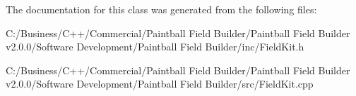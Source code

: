 The documentation for this class was generated from the following files:\begin{DoxyCompactItemize}
\item 
C:/Business/C++/Commercial/Paintball Field Builder/Paintball Field Builder v2.0.0/Software Development/Paintball Field Builder/inc/FieldKit.h\item 
C:/Business/C++/Commercial/Paintball Field Builder/Paintball Field Builder v2.0.0/Software Development/Paintball Field Builder/src/FieldKit.cpp\end{DoxyCompactItemize}
